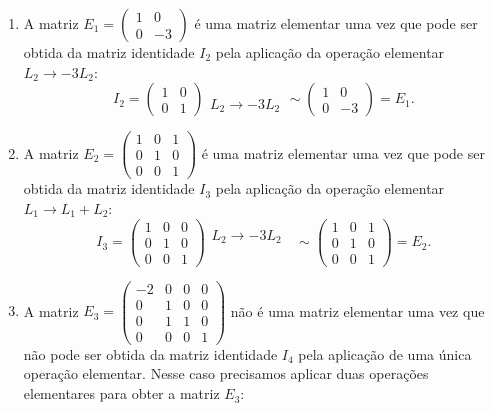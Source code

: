\begin{exemplos}
    \begin{enumerate}
        \item A matriz $E_1 = \begin{pmatrix}1 & 0\\0 & -3\end{pmatrix}$ é uma matriz elementar uma vez que pode ser obtida da matriz identidade $I_2$ pela aplicação da operação elementar $L_2 \to -3L_2$:
        \[
            I_2 = \begin{pmatrix}
                1 & 0\\
                0 & 1
            \end{pmatrix}
            \begin{array}{l}
                \phantom{x}\\L_2 \to -3L_2
            \end{array}\sim
            \begin{pmatrix}
                1 & 0\\
                0 & -3
            \end{pmatrix} = E_1.
        \]
        \item A matriz $E_2 = \begin{pmatrix}1 & 0 & 1\\0 & 1 & 0\\0 & 0 & 1\end{pmatrix}$ é uma matriz elementar uma vez que pode ser obtida da matriz identidade $I_3$ pela aplicação da operação elementar $L_1 \to L_1 + L_2$:
        \[
            I_3 = \begin{pmatrix}
                1 & 0 & 0\\
                0 & 1 & 0\\
                0 & 0 & 1
            \end{pmatrix}
            \begin{array}{l}
                L_2 \to -3L_2\phantom{x}\\\phantom{x}
            \end{array}\sim
            \begin{pmatrix}
                1 & 0 & 1\\
                0 & 1 & 0\\
                0 & 0 & 1
            \end{pmatrix} = E_2.
        \]
        \item A matriz $E_3 = \begin{pmatrix}-2 & 0 & 0 & 0\\0 & 1 & 0 & 0\\0 & 1 & 1 & 0\\0 & 0 & 0 & 1\end{pmatrix}$ não é uma matriz elementar uma vez que não pode ser obtida da matriz identidade $I_4$ pela aplicação de uma única operação elementar. Nesse caso precisamos aplicar duas operações elementares para obter a matriz $E_3$:

\end{enumerate}
\end{exemplos}
